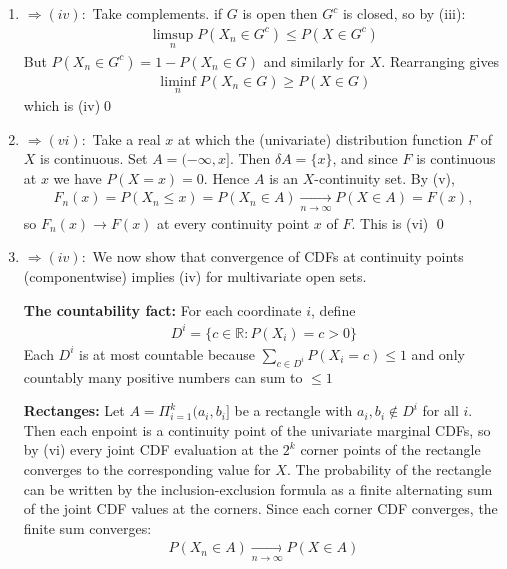 \documentclass[10pt]{article}
\begin{document}
\begin{enumerate}[label=\textit{(\roman*)}]
    \item $\Longrightarrow (iv):$ Take complements. if $G$ is open then $G^c$ is closed, so by (iii):
    \begin{gather*}
        \limsup_nP(X_n\in G^c)\leq P(X\in G^c)
    \end{gather*}
    But $P(X_n \in G^c) = 1 - P(X_n \in G)$ and similarly for $X$. Rearranging gives 
    \begin{gather*}
        \liminf_nP(X_n \in G) \geq P(X \in G)
    \end{gather*}
    which is (iv)\qed
    \setcounter{enumi}{4}
    \item $\Longrightarrow (vi):$ Take a real $x$ at which the (univariate) distribution function $F$ of $X$ is continuous. Set $A = (-\infty, x]$. Then $\delta A = \{x\}$, and since $F$ is continuous at $x$ we have $P(X = x) = 0$. Hence $A$ is an $X$-continuity set. By (v),
    \begin{gather*}
        F_n(x) = P(X_n \leq x) = P(X_n \in A) \xrightarrow[n \to \infty]{}P(X \in A) = F(x),
    \end{gather*}
    so $F_n(x) \to F(x)$ at every continuity point $x$ of $F$. This is (vi) \qed
    \item $\Longrightarrow (iv):$ We now show that convergence of CDFs at continuity points (componentwise) implies (iv) for multivariate open sets.
    
    \textbf{The countability fact:} For each coordinate $i$, define 
    \begin{gather*}
        D^i = \{c \in \mathbb{R}: P(X_i) = c>0\}
    \end{gather*}
    Each $D^i$ is at most countable because $\sum_{c \in D^i}P(X_i = c) \leq 1$ and only countably many positive numbers can sum to $\leq1$

    \textbf{Rectanges:} Let $A = \Pi_{i = 1}^k (a_i, b_i]$ be a rectangle with $a_i, b_i \notin D^i$ for all $i$. Then each enpoint is a continuity point of the univariate marginal CDFs, so by (vi) every joint CDF evaluation at the $2^k$ corner points of the rectangle converges to the corresponding value for $X$. The probability of the rectangle can be written by the inclusion-exclusion formula as a finite alternating sum of the joint CDF values at the corners. Since each corner CDF converges, the finite sum converges: 
    \begin{gather*}
        P(X_n \in A) \xrightarrow[n \to \infty]{}P(X \in A) 
    \end{gather*}


\end{enumerate}
\end{document}
